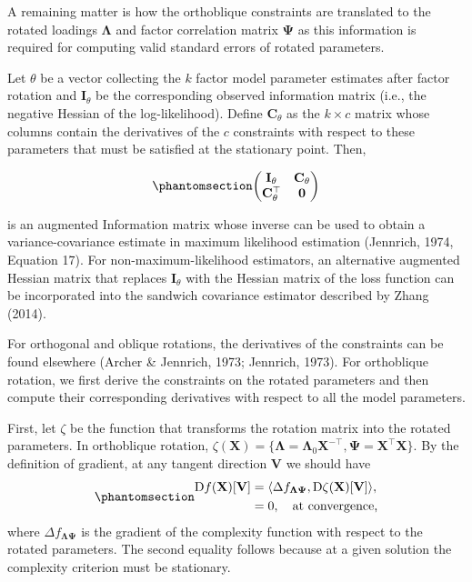 \documentclass[
  12pt,
  letterpaper,
  article]{scrartcl}
\begin{document}
A remaining matter is how the orthoblique constraints are translated to
the rotated loadings \(\mathbf{\Lambda}\) and factor correlation matrix
\(\mathbf{\Psi}\) as this information is required for computing valid
standard errors of rotated parameters.

Let \(\theta\) be a vector collecting the \(k\) factor model parameter
estimates after factor rotation and \(\mathbf{I}_{\theta}\) be the
corresponding observed information matrix (i.e., the negative Hessian of
the log-likelihood). Define \(\mathbf{C}_{\theta}\) as the \(k\times c\)
matrix whose columns contain the derivatives of the \(c\) constraints
with respect to these parameters that must be satisfied at the
stationary point. Then,

\begin{equation}\protect\phantomsection\label{eq-augmented-information}{
\begin{pmatrix}
\mathbf{I}_{\theta} & \mathbf{C}_{\theta} \\
\mathbf{C}_{\theta}^\top & \mathbf{0}
\end{pmatrix}
}\end{equation}

is an augmented Information matrix whose inverse can be used to obtain a
variance-covariance estimate in maximum likelihood estimation (Jennrich,
1974, Equation 17). For non-maximum-likelihood estimators, an
alternative augmented Hessian matrix that replaces \(\mathbf{I}_\theta\)
with the Hessian matrix of the loss function can be incorporated into
the sandwich covariance estimator described by Zhang (2014).

For orthogonal and oblique rotations, the derivatives of the constraints
can be found elsewhere (Archer \& Jennrich, 1973; Jennrich, 1973). For
orthoblique rotation, we first derive the constraints on the rotated
parameters and then compute their corresponding derivatives with respect
to all the model parameters.

First, let \(\zeta\) be the function that transforms the rotation matrix
into the rotated parameters. In orthoblique rotation,
\(\zeta(\mathbf{X}) = \{\mathbf{\Lambda} = \mathbf{\Lambda}_0\mathbf{X}^{-\top}, \mathbf{\Psi} = \mathbf{X}^\top\mathbf{X}\}\).
By the definition of gradient, at any tangent direction \(\mathbf{V}\)
we should have
\begin{equation}\protect\phantomsection\label{eq-differential_rotated}{
\begin{aligned}
\text{D}f(\mathbf{X})[\mathbf{V}] &= \langle \Delta f_\mathbf{\Lambda\Psi}, \text{D}\zeta(\mathbf{X})[\mathbf{V}]\rangle, \\
&= 0, \quad \text{at convergence,}
\end{aligned}
}\end{equation} where \(\Delta f_\mathbf{\Lambda\Psi}\) is the gradient
of the complexity function with respect to the rotated parameters. The
second equality follows because at a given solution the complexity
criterion must be stationary.
\end{document}
